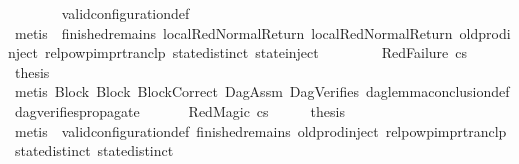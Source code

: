 \begin{isabellebody}
\ \ \ \ \ \ \isamarkupfalse%
\ valid{\isacharunderscore}{\kern0pt}configuration{\isacharunderscore}{\kern0pt}def\isanewline
\ \ \ \ \ \ \isamarkupfalse%
\ {\isacharparenleft}{\kern0pt}metis\ {\isachardoublequoteopen}{}{\isachardoublequoteclose}{\isacharparenleft}{\kern0pt}{}{\isacharparenright}{\kern0pt}\ finished{\isacharunderscore}{\kern0pt}remains\ local{\isachardot}{\kern0pt}RedNormalReturn{\isacharparenleft}{\kern0pt}{}{\isacharparenright}{\kern0pt}\ local{\isachardot}{\kern0pt}RedNormalReturn{\isacharparenleft}{\kern0pt}{}{\isacharparenright}{\kern0pt}\ old{\isachardot}{\kern0pt}prod{\isachardot}{\kern0pt}inject\ relpowp{\isacharunderscore}{\kern0pt}imp{\isacharunderscore}{\kern0pt}rtranclp\ state{\isachardot}{\kern0pt}distinct{\isacharparenleft}{\kern0pt}{}{\isacharparenright}{\kern0pt}\ state{\isachardot}{\kern0pt}inject{\isacharparenright}{\kern0pt}\isanewline
\ \ \isamarkupfalse%
\isanewline
\ \ \ \ \isamarkupfalse%
\ {\isacharparenleft}{\kern0pt}RedFailure\ cs{\isacharparenright}{\kern0pt}\isanewline
\ \ \ \ \isamarkupfalse%
\ \isamarkupfalse%
\ {\isacharquery}{\kern0pt}thesis\isanewline
\ \ \ \ \ \ \isamarkupfalse%
\ {\isacharparenleft}{\kern0pt}metis\ Block\ Block{}\ BlockCorrect\ DagAssm\ DagVerifies\ dag{\isacharunderscore}{\kern0pt}lemma{\isacharunderscore}{\kern0pt}conclusion{\isacharunderscore}{\kern0pt}def\ dag{\isacharunderscore}{\kern0pt}verifies{\isacharunderscore}{\kern0pt}propagate{\isacharunderscore}{\kern0pt}{}{\isacharparenright}{\kern0pt}\isanewline
\ \ \isamarkupfalse%
\isanewline
\ \ \isamarkupfalse%
\ {\isacharparenleft}{\kern0pt}RedMagic\ cs{\isacharparenright}{\kern0pt}\isanewline
\ \ \isamarkupfalse%
\ \isamarkupfalse%
\ {\isacharquery}{\kern0pt}thesis\ \isanewline
\ \ \ \ \isamarkupfalse%
\ {\isacharparenleft}{\kern0pt}metis\ {\isachardoublequoteopen}{}{\isachardoublequoteclose}{\isacharparenleft}{\kern0pt}{}{\isacharparenright}{\kern0pt}\ valid{\isacharunderscore}{\kern0pt}configuration{\isacharunderscore}{\kern0pt}def\ finished{\isacharunderscore}{\kern0pt}remains\ old{\isachardot}{\kern0pt}prod{\isachardot}{\kern0pt}inject\ relpowp{\isacharunderscore}{\kern0pt}imp{\isacharunderscore}{\kern0pt}rtranclp\ state{\isachardot}{\kern0pt}distinct{\isacharparenleft}{\kern0pt}{}{\isacharparenright}{\kern0pt}\ state{\isachardot}{\kern0pt}distinct{\isacharparenleft}{\kern0pt}{}{\isacharparenright}{\kern0pt}{\isacharparenright}{\kern0pt}\isanewline

\end{isabellebody}
